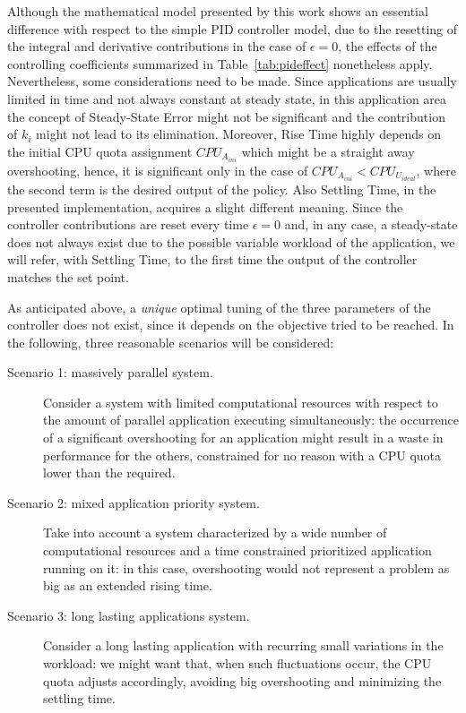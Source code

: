Although the mathematical model presented by this work shows an essential difference with respect to the simple PID controller model, due to the resetting of the integral and derivative contributions in the case of $\epsilon=0$, the effects of the controlling coefficients summarized in Table~\ref{tab:pideffect} nonetheless apply. Nevertheless, some considerations need to be made. Since applications are usually limited in time and not always constant at steady state, in this application area the concept of Steady-State Error might not be significant and the contribution of $k_{i}$ might not lead to its elimination. Moreover, Rise Time highly depends on the initial CPU quota assignment $CPU_{A_{ini}}$ which might be a straight away overshooting, hence, it is significant only in the case of $CPU_{A_{ini}} < CPU_{U_{ideal}}$, where the second term is the desired output of the policy. Also Settling Time, in the presented implementation, acquires a slight different meaning. Since the controller contributions are reset every time $\epsilon=0$ and, in any case, a steady-state does not always exist due to the possible variable workload of the application, we will refer, with Settling Time, to the first time the output of the controller matches the set point.

As anticipated above, a \emph{unique} optimal tuning of the three parameters of the controller does not exist, since it depends on the objective tried to be reached. In the following, three reasonable scenarios will be considered:
\begin{description}
\item[Scenario 1: massively parallel system.] Consider a system with limited computational resources with respect to the amount of parallel application executing simultaneously: the occurrence of a significant overshooting for an application might result in a waste in performance for the others, constrained for no reason with a CPU quota lower than the required.
\item[Scenario 2: mixed application priority system.] Take into account a system characterized by a wide number of computational resources and a time constrained prioritized application running on it: in this case, overshooting would not represent a problem as big as an extended rising time. 
\item[Scenario 3: long lasting applications system.] Consider a long lasting application with recurring small variations in the workload: we might want that, when such fluctuations occur, the CPU quota adjusts accordingly, avoiding big overshooting and minimizing the settling time.
\end{description}

